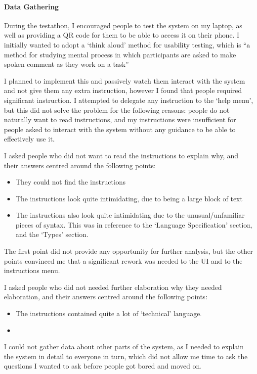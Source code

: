 \paragraph{Data Gathering}
During the testathon, I encouraged people to test the system on my laptop, as well as providing a QR code for them to be able to access it on their phone. I initially wanted to adopt a `think aloud' method for usability testing, which is ``a method for studying mental process in which participants are asked to make spoken comment as they work on a task''\cite{thinkaloud}

I planned to implement this and passively watch them interact with the system and not give them any extra instruction, however I found that people required significant instruction. I attempted to delegate any instruction to the `help menu', but this did not solve the problem for the following reasons: people do not naturally want to read instructions, and my instructions were insufficient for people asked to interact with the system without any guidance to be able to effectively use it.

I asked people who did not want to read the instructions to explain why, and their answers centred around the following points:
\begin{itemize}
    \item They could not find the instructions
    \item The instructions look quite intimidating, due to being a large block of text
    \item The instructions also look quite intimidating due to the unusual/unfamiliar pieces of syntax. This was in reference to the `Language Specification' section, and the `Types' section.
\end{itemize}
The first point did not provide any opportunity for further analysis, but the other points convinced me that a significant rework was needed to the UI and to the instructions menu. 

I asked people who did not needed further elaboration why they needed elaboration, and their answers centred around the following points:
\begin{itemize}
    \item The instructions contained quite a lot of `technical' language.
    \item 
\end{itemize}

I could not gather data about other parts of the system, as I needed to explain the system in detail to everyone in turn, which did not allow me time to ask the questions I wanted to ask before people got bored and moved on. 

